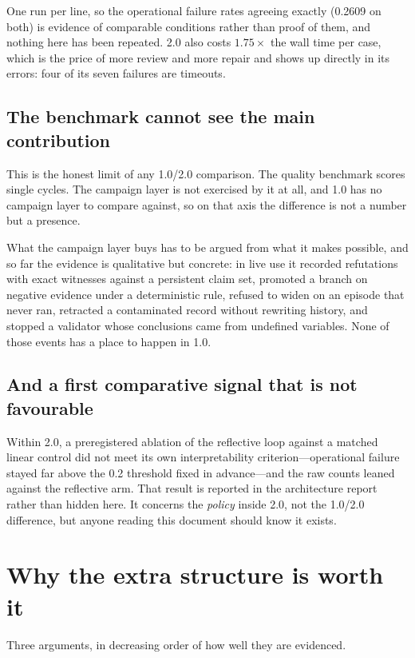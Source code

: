 \documentclass[11pt,a4paper]{article}
\begin{document}
One run per line, so the operational failure rates agreeing exactly (0.2609 on
both) is evidence of comparable conditions rather than proof of them, and
nothing here has been repeated. 2.0 also costs $1.75\times$ the wall time per
case, which is the price of more review and more repair and shows up directly in
its errors: four of its seven failures are timeouts.

\subsection{The benchmark cannot see the main contribution}

This is the honest limit of any 1.0/2.0 comparison. The quality benchmark scores
single cycles. The campaign layer is not exercised by it at all, and 1.0 has no
campaign layer to compare against, so on that axis the difference is not a
number but a presence.

What the campaign layer buys has to be argued from what it makes possible, and
so far the evidence is qualitative but concrete: in live use it recorded
refutations with exact witnesses against a persistent claim set, promoted a
branch on negative evidence under a deterministic rule, refused to widen on an
episode that never ran, retracted a contaminated record without rewriting
history, and stopped a validator whose conclusions came from undefined
variables. None of those events has a place to happen in 1.0.

\subsection{And a first comparative signal that is not favourable}

Within 2.0, a preregistered ablation of the reflective loop against a matched
linear control did not meet its own interpretability criterion---operational
failure stayed far above the 0.2 threshold fixed in advance---and the raw counts
leaned against the reflective arm. That result is reported in the architecture
report rather than hidden here. It concerns the \emph{policy} inside 2.0, not
the 1.0/2.0 difference, but anyone reading this document should know it exists.

\section{Why the extra structure is worth it}

Three arguments, in decreasing order of how well they are evidenced.
\end{document}
